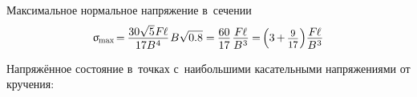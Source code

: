\documentclass[14pt]{extarticle}
\begin{document}
Максимальное нормальное напряжение в~сечении
\[
\upsigma_{\hspace{-0.2ex}\scalebox{.75}{max}} \hspace{-.33ex}
= \hspace{-.15ex} \displaystyle\frac{\raisebox{-0.18em}{$30 \sqrt{5} \hspace{.1ex} F \hspace{-0.1ex} \ell$}}{17 B^{\hspace{.1ex}4}} \hspace{.2ex} B \sqrt{0.8}
= \hspace{-.1ex} \displaystyle\frac{\raisebox{-0.18em}{$60$}}{17} \hspace{.2ex} \displaystyle\frac{\raisebox{-0.18em}{$F \hspace{-0.1ex} \ell$}}{B^{\hspace{.1ex}3}} \hspace{-.1ex}
= \hspace{-.25ex} \left( 3 \hspace{-.15ex}+\hspace{-.15ex} \scalebox{.88}{$ \displaystyle\frac{\raisebox{-0.18em}{$9$}}{17} $} \hspace{.1ex} \right) \hspace{-.4ex} \displaystyle\frac{\raisebox{-0.18em}{$F \hspace{-0.1ex} \ell$}}{B^{\hspace{.1ex}3}}
\]

\vspace{.2cm}

Напряжённое состояние в~точках с~наибольшими касательными напряжениями от кручения:
\end{document}
